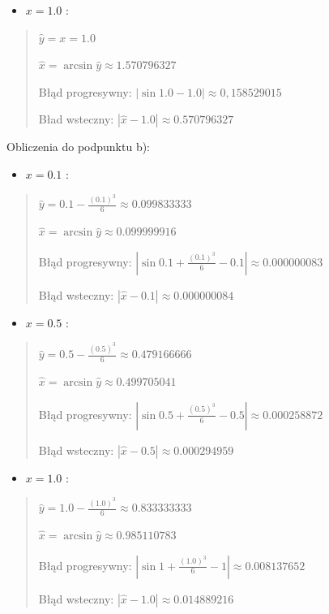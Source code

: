 \documentclass[10pt]{article}
\begin{document}
\vspace{2cm}
\begin{itemize}
  \item $x=1.0$ :
\end{itemize}

\begin{quote}
        $\hat{y}=x=1.0$

        $\hat{x}=\arcsin \hat{y} \approx 1.570796327$

        Błąd progresywny: $|\sin 1.0-1.0| \approx 0,158529015$

        Bład wsteczny: $|\hat{x}-1.0| \approx 0.570796327$
\end{quote}

Obliczenia do podpunktu b):
\begin{itemize}
  \item $x=0.1$ :
\end{itemize}

\begin{quote}
$\hat{y}=0.1-\frac{(0.1)^{3}}{6} \approx 0.099833333$

$\hat{x}=\arcsin \hat{y} \approx 0.099999916 $

Błąd progresywny: $|\sin 0.1 + \frac{(0.1)^{3}}{6} -0.1| \approx 0.000000083$

Błąd wsteczny: $|\hat{x}-0.1| \approx 0.000000084$
\end{quote}
\begin{itemize}
  \item $x=0.5$ :
\end{itemize}

\begin{quote}
$\hat{y}=0.5-\frac{(0.5)^{3}}{6} \approx 0.479166666$

$\hat{x}=\arcsin \hat{y} \approx 0.499705041$

Błąd progresywny: $\left|\sin 0.5+\frac{(0.5)^{3}}{6}-0.5\right| \approx 0.000258872$

Błąd wsteczny: $|\hat{x}-0.5| \approx 0.000294959$
\end{quote}
\begin{itemize}
  \item $x=1.0$ :
\end{itemize}

\begin{quote}
$\hat{y}=1.0-\frac{(1.0)^{3}}{6} \approx 0.833333333$

$\hat{x}=\arcsin \hat{y} \approx 0.985110783$

Błąd progresywny: $\left|\sin 1 + \frac{(1.0)^{3}}{6}- 1 \right| \approx 0.008137652$

Błąd wsteczny: $|\hat{x}-1.0| \approx 0.014889216$
\end{quote}
\end{document}
